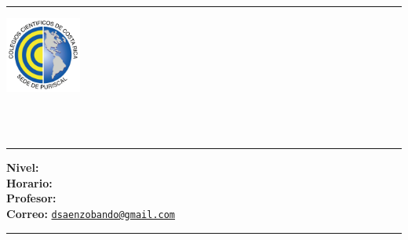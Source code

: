 \newcommand{\doublerule}[1][.4pt]{
  \noindent
  \makebox[0pt][l]{\rule[.7ex]{\linewidth}{#1}}%
  \rule[1pt]{\linewidth}{#1}\par}

{
  \centering
  \doublerule
    \begin{minipage}[c]{0.3\textwidth}
      \includegraphics[width=2.5cm]{images/logo.jpg}
    \end{minipage}
    \begin{minipage}[c]{0.6\textwidth}

  {\scshape
    \vspace{0.3cm}
    \LARGE \coursetitle
    \\[0.25cm]
    \large\textsc{\school}
    \\
    \normalsize\textsc{\semester}\par
    \vspace{0.3cm}
  }
    \end{minipage}

  \vspace{0.05cm}

  \hrule
}

\begin{multicols}{2}
  \textbf{Nivel:} \grade \\
  \textbf{Horario:} \horario \\
  \textbf{Profesor:} \instructor \\
  \textbf{Correo:} \href{mailto:dsaenzobando@gmail.com}{\texttt{dsaenzobando@gmail.com}}
\end{multicols}

\vspace{-0.5cm}

\doublerule

